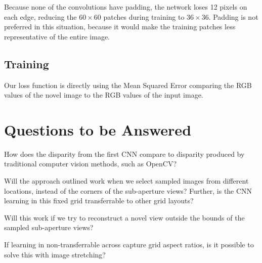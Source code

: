 \documentclass[10pt,twocolumn,letterpaper]{article}
\begin{document}
Because none of the convolutions have padding, the network loses 12 pixels on each edge, reducing
the $60 \times 60$ patches during training to $36 \times 36$. Padding is not preferred in this situation, 
because it would make the training patches less representative of the entire image.

\subsection{Training}

Our loss function is directly using the Mean Squared Error comparing the RGB values of the novel image
to the RGB values of the input image. 

\section{Questions to be Answered}

How does the disparity from the first CNN compare to disparity produced 
by traditional computer vision methods, such as OpenCV?

Will the approach outlined work when we select sampled images from different locations, instead 
of the corners of the sub-aperture views? Further, is the CNN learning in this fixed grid transferrable
to other grid layouts?

Will this work if we try to reconstruct a novel view outside the bounds of the sampled sub-aperture views?

If learning in non-transferrable across capture grid aspect ratios, is it possible to solve this with
image stretching?

{\small


}
\end{document}
